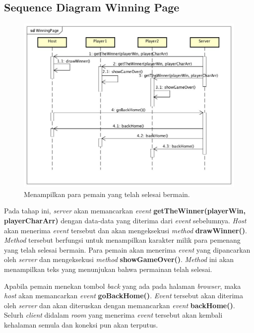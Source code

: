 \subsection{Sequence Diagram Winning Page}
\begin{figure}[H]
	\centering
	\includegraphics[scale=0.3]{Gambar/WinningPage}
	\caption{Menampilkan para pemain yang telah selesai bermain.}
	\label{fig:4_WinningPage}
\end{figure}

Pada tahap ini, \textit{server} akan memancarkan \textit{event} \textbf{getTheWinner(playerWin, playerCharArr)} dengan data-data yang diterima dari \textit{event} sebelumnya. \textit{Host} akan menerima \textit{event} tersebut dan akan mengeksekusi \textit{method} \textbf{drawWinner()}. \textit{Method} tersebut berfungsi untuk menampilkan karakter milik para pemenang yang telah selesai bermain. Para pemain akan menerima \textit{event} yang dipancarkan oleh \textit{server} dan mengeksekusi \textit{method} \textbf{showGameOver()}. \textit{Method} ini akan menampilkan teks yang menunjukan bahwa permainan telah selesai.

Apabila pemain menekan tombol \textit{back} yang ada pada halaman \textit{browser}, maka \textit{host} akan memancarkan \textit{event} \textbf{goBackHome()}. \textit{Event} tersebut akan diterima oleh \textit{server} dan akan diteruskan dengan memancarkan \textit{event} \textbf{backHome()}. Selurh \textit{client} didalam \textit{room} yang menerima \textit{event} tersebut akan kembali kehalaman semula dan koneksi pun akan terputus.


